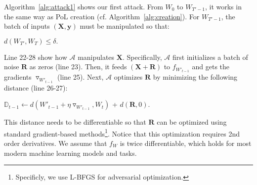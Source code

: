 \documentclass[conference]{IEEEtran}
\newcommand{\Adv}{\mathcal{A}\xspace}
\newcommand{\XX}{\mathbf{X}\xspace}
\newcommand{\yy}{\mathbf{y}\xspace}
\newcommand{\RR}{\mathbf{R}\xspace}
\begin{document}
    














Algorithm~\ref{alg:attack1} shows our first attack.
From $W_0$ to $W_{T'-1}$, it works in the same way as PoL {creation\EndAccSupp{}} (cf. Algorithm~\ref{alg:creation}).
For $W_{T'-1}$, the batch of {inputs\EndAccSupp{}} $(\XX, \yy)$ must be manipulated so that:





\begin{center}
    $d(W_{T'}, W_T) \leq \delta.$
\end{center}

Line 22-28 show how $\Adv$ manipulates $\XX$.
Specifically, $\Adv$ first initializes a batch of noise $\RR$ as {zeros\EndAccSupp{}} (line 23).
Then, it feeds $(\XX+\RR)$ to $f_{W'_{t-1}}$ and gets the {gradients\EndAccSupp{}} $\triangledown_{W'_{t-1}}$ (line 25).
Next, $\Adv$ optimizes $\RR$ by minimizing the following distance (line 26-27):
\begin{center}
    $\mathbb{D}_{t-1} \leftarrow d(W'_{t-1}+\eta \triangledown_{W'_{t-1}}, W_{t})$ + $d(\mathbf{R}, 0).$
\end{center}
This distance needs to be {differentiable\EndAccSupp{}} so that $\RR$ can be optimized using standard gradient-based methods\footnote{Specificly, we use L-BFGS for adversarial optimization.}. 
Notice that this optimization requires 2nd order derivatives. We assume that $f_{W}$ is twice differentiable, which {holds\EndAccSupp{}} for most modern machine {learning\EndAccSupp{}} models and tasks.
\end{document}
